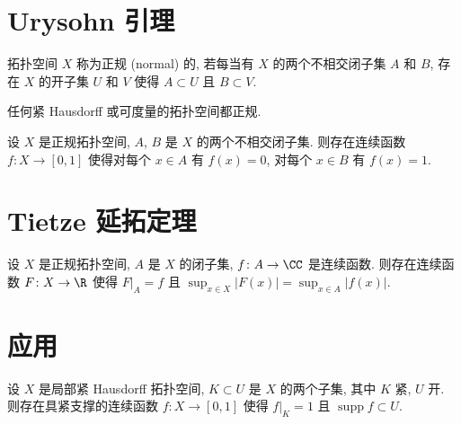 
\section{Urysohn 引理}

\begin{definition}
\label{def:A.1.1}
拓扑空间 $X$ 称为正规 (normal) 的, 若每当有 $X$ 的两个不相交闭子集 $A$ 和 $B$, 存在 $X$ 的开子集 $U$ 和 $V$ 使得 $A \subset U$ 且 $B \subset V$.
\end{definition}

\begin{proposition}
\label{prop:A.1.2}
任何紧 Hausdorff 或可度量的拓扑空间都正规.
\end{proposition}

\begin{theorem}
\label{thm:A.1.3}
设 $X$ 是正规拓扑空间, $A$, $B$ 是 $X$ 的两个不相交闭子集. 则存在连续函数 $f \colon X \to [0, 1]$ 使得对每个 $x \in A$ 有 $f(x) = 0$, 对每个 $x \in B$ 有 $f(x) = 1$.
\end{theorem}

\section{Tietze 延拓定理}

\begin{corollary}
\label{cor:A.2.1}
设 $X$ 是正规拓扑空间, $A$ 是 $X$ 的闭子集, $f \colon A \to \CC$ 是连续函数. 则存在连续函数 $F \colon X \to \R$ 使得 $F|_A = f$ 且 $\sup_{x \in X}|F(x)| = \sup_{x \in A}|f(x)|$.
\end{corollary}

\section{应用}

\begin{corollary}[紧集与开集的分离]
\label{cor:A.3.1}
设 $X$ 是局部紧 Hausdorff 拓扑空间, $K \subset U$ 是 $X$ 的两个子集, 其中 $K$ 紧, $U$ 开. 则存在具紧支撑的连续函数 $f \colon X \to [0, 1]$ 使得 $f|_K = 1$ 且 $\operatorname{supp} f \subset U$.
\end{corollary}

